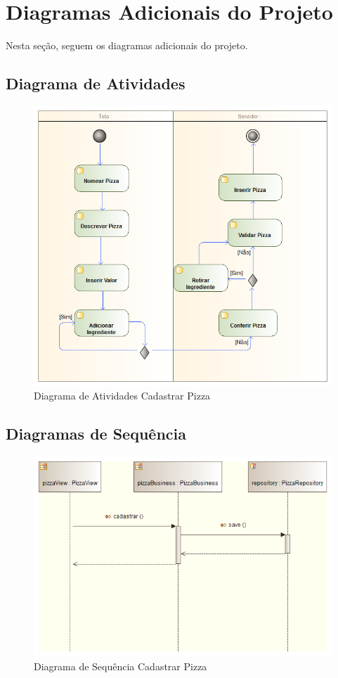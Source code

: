 \section{Diagramas Adicionais do Projeto}

Nesta seção, seguem os diagramas adicionais do projeto.

\subsection{Diagrama de Atividades}

\begin{figure}[h!]
 \centering
 \includegraphics[scale=0.6]{capitulo07/diagramaAtividades.png}
 \caption{Diagrama de Atividades Cadastrar Pizza}
\end{figure}

\newpage
\subsection{Diagramas de Sequência}

\begin{figure}[h!]
 \centering
 \includegraphics[scale=0.6]{capitulo07/diagramaSequenciasCadastrarPizzas.png}
 \caption{Diagrama de Sequência Cadastrar Pizza}
\end{figure}

